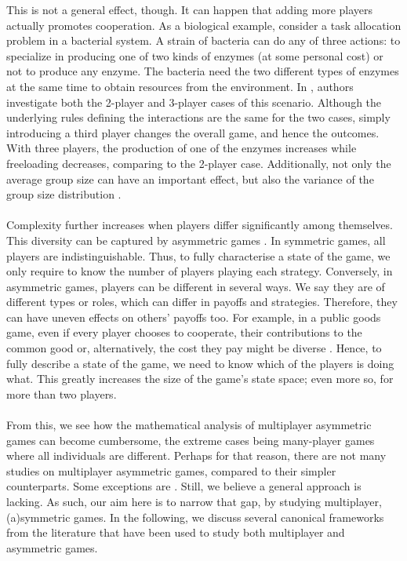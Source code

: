 \documentclass[11pt]{article}
\theoremstyle{plainCl1}
\theoremstyle{plainCl2}
\begin{document}
This is not a general effect, though. It can happen that adding more players actually promotes cooperation. As a biological example, consider a task allocation problem in a bacterial system. A strain of bacteria can do any of three actions: to specialize in producing one of two kinds of enzymes (at some personal cost) or not to produce any enzyme. The bacteria need the two different types of enzymes at the same time to obtain resources from the environment. In \cite{gokhale:JTB:2011}, authors investigate both the 2-player and 3-player cases of this scenario. Although the underlying rules defining the interactions are the same for the two cases, simply introducing a third player changes the overall game, and hence the outcomes. With three players, the production of one of the enzymes increases while freeloading decreases, comparing to the 2-player case.
Additionally, not only the average group size can have an important effect, but also the variance of the group size distribution \cite{Pena:Evolution:2011, Broom:BMB:2019}.
\\ \\ 
\noindent Complexity further increases when players differ significantly among themselves. This diversity can be captured by asymmetric games \cite{Taylor:JAP:1979, Schuster:AB:1981, Gaunersdorfer:TPB:1991, Hofbauer:JMB:1996, Hofbauer:GEB:2005, Ohtsuki:JTB:2010, McAvoy:PlosCB:2015, Veller:JET:2016, Hauser:Nature:2019}. In symmetric games, all players are indistinguishable. Thus, to fully characterise a state of the game, we only require to know the number of players playing each strategy. Conversely, in asymmetric games, players can be different in several ways. We say they are of different types or roles, which can differ in payoffs and strategies. Therefore, they can have uneven effects on others' payoffs too. For example, in a public goods game, even if every player chooses to cooperate, their contributions to the common good or, alternatively, the cost they pay might be diverse \cite{Hauser:Nature:2019}. Hence, to fully describe a state of the game, we need to know which of the players is doing what. This greatly increases the size of the game's state space; even more so, for more than two players. \\ \\ 
\noindent From this, we see how the mathematical analysis of multiplayer asymmetric games can become cumbersome, the extreme cases being many-player games where all individuals are different. Perhaps for that reason, there are not many studies on multiplayer asymmetric games, compared to their simpler counterparts. Some exceptions are \cite{Hauser:Nature:2019}. %
Still, we believe a general approach is lacking. As such, our aim here is to narrow that gap, by studying multiplayer, (a)symmetric games. In the following, we discuss several canonical frameworks from the literature that have been used to study both multiplayer and asymmetric games.%
\end{document}
